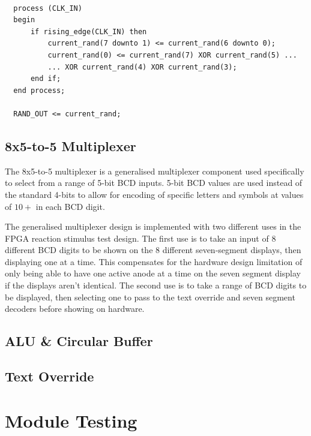 \documentclass[12pt]{article}
\newenvironment{code}{\captionsetup{type=listing}}{}
\begin{document}
\begin{code}
\begin{verbatim}

  process (CLK_IN)
  begin
      if rising_edge(CLK_IN) then
          current_rand(7 downto 1) <= current_rand(6 downto 0);
          current_rand(0) <= current_rand(7) XOR current_rand(5) ...
          ... XOR current_rand(4) XOR current_rand(3);
      end if;
  end process;

  RAND_OUT <= current_rand;
\end{verbatim}
\captionsetup{belowskip=0pt}
\label{code:lfsr}
\end{code}

\subsection{8x5-to-5 Multiplexer}
The 8x5-to-5 multiplexer is a generalised multiplexer component used specifically to select from a range of 5-bit BCD inputs. 5-bit BCD values are used instead of the standard 4-bits to allow for encoding of specific letters and symbols at values of $10+$ in each BCD digit. 

The generalised multiplexer design is implemented with two different uses in the FPGA reaction stimulus test design. The first use is to take an input of 8 different BCD digits to be shown on the 8 different seven-segment displays, then displaying one at a time. This compensates for the hardware design limitation of only being able to have one active anode at a time on the seven segment display if the displays aren't identical. The second use is to take a range of BCD digits to be displayed, then selecting one to pass to the text override and seven segment decoders before showing on hardware.


\subsection{ALU \& Circular Buffer}


\subsection{Text Override}



\newpage

\section{Module Testing}
\end{document}
